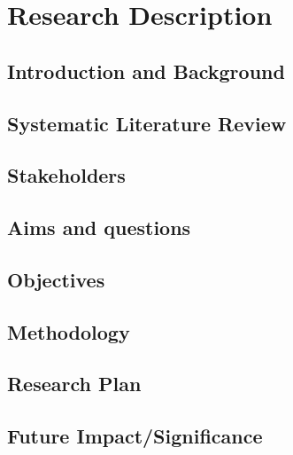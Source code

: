 \chapter{Research Description}\label{ch:Intro}

\section{Introduction and Background}\label{sec:disBackground}


\section{Systematic Literature Review}\label{sec:disSLR}


\section{Stakeholders}\label{sec:disStakeholders}


\section{Aims and questions}\label{sec:disAims}


\section{Objectives}\label{sec:disObjectives}


\section{Methodology}\label{sec:disMethodology}


\section{Research Plan}\label{sec:disResearchPlan}


\section{Future Impact/Significance}\label{sec:disFutureImpact}













